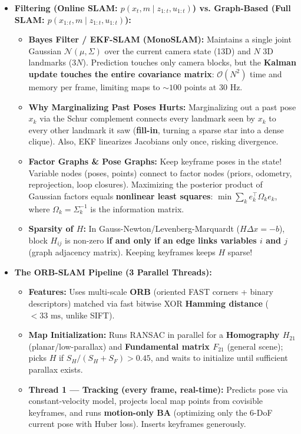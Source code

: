 \documentclass[11pt,a4paper]{article}
\theoremstyle{definition}
\theoremstyle{plain}
\theoremstyle{remark}
\begin{document}
\begin{itemize}
    \item \textbf{Filtering (Online SLAM: $p(x_t, m \mid z_{1:t}, u_{1:t})$) vs. Graph-Based (Full SLAM: $p(x_{1:t}, m \mid z_{1:t}, u_{1:t})$):}
    \begin{itemize}
        \item \textbf{Bayes Filter / EKF-SLAM (MonoSLAM):} Maintains a single joint Gaussian $\mathcal{N}(\mu, \Sigma)$ over the current camera state (13D) and $N$ 3D landmarks ($3N$). Prediction touches only camera blocks, but the \textbf{Kalman update touches the entire covariance matrix}: $\mathcal{O}(N^2)$ time and memory per frame, limiting maps to $\sim 100$ points at 30 Hz.
        \item \textbf{Why Marginalizing Past Poses Hurts:} Marginalizing out a past pose $x_k$ via the Schur complement connects every landmark seen by $x_k$ to every other landmark it saw (\textbf{fill-in}, turning a sparse star into a dense clique). Also, EKF linearizes Jacobians only once, risking divergence.
        \item \textbf{Factor Graphs \& Pose Graphs:} Keep keyframe poses in the state! Variable nodes (poses, points) connect to factor nodes (priors, odometry, reprojection, loop closures). Maximizing the posterior product of Gaussian factors equals \textbf{nonlinear least squares}: $\min \sum_k e_k^\top \Omega_k e_k$, where $\Omega_k = \Sigma_k^{-1}$ is the information matrix.
        \item \textbf{Sparsity of $H$:} In Gauss-Newton/Levenberg-Marquardt ($H\Delta x = -b$), block $H_{ij}$ is non-zero \textbf{if and only if an edge links variables $i$ and $j$} (graph adjacency matrix). Keeping keyframes keeps $H$ sparse!
    \end{itemize}
    \item \textbf{The ORB-SLAM Pipeline (3 Parallel Threads):}
    \begin{itemize}
        \item \textbf{Features:} Uses multi-scale \textbf{ORB} (oriented FAST corners + binary descriptors) matched via fast bitwise XOR \textbf{Hamming distance} ($<33\text{ ms}$, unlike SIFT).
        \item \textbf{Map Initialization:} Runs RANSAC in parallel for a \textbf{Homography $H_{21}$} (planar/low-parallax) and \textbf{Fundamental matrix $F_{21}$} (general scene); picks $H$ if $S_H/(S_H+S_F) > 0.45$, and waits to initialize until sufficient parallax exists.
        \item \textbf{Thread 1 --- Tracking (every frame, real-time):} Predicts pose via constant-velocity model, projects local map points from covisible keyframes, and runs \textbf{motion-only BA} (optimizing only the 6-DoF current pose with Huber loss). Inserts keyframes generously.

\end{itemize}
\end{itemize}
\end{document}
